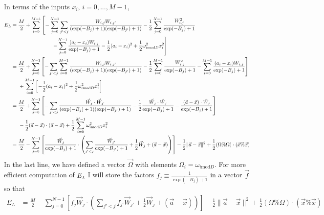 \documentclass[12pt]{article}
\begin{document}
In terms of the inputs $x_i$, $i = 0, ..., M-1$,
\begin{align*}
E_L &= \frac{M}{2} +\sum_{i=0}^{M-1} \left[ - \sum_{j=0}^{N-1} \sum_{j'<j} \frac{W_{i,j}W_{i,j'}}{(\exp(-B_j)+1)(\exp(-B_{j'})+1)}
-\frac{1}{2} \sum_{j=0}^{N-1} \frac{W_{i,j}^2}{\exp(-B_j)+1} \right.\\
&\hspace*{2.75cm} \left. -\sum_{j=0}^{N-1} \frac{(a_{i} -x_i ) W_{i,j}}{\exp(-B_j)+1} - \frac{1}{2} (a_{i}-x_i)^2 + \frac{1}{2} \omega_{i\text{mod}D}^2 x_i^2 \right]\\
&= \frac{M}{2} +\sum_{j=0}^{N-1} \left[ - \sum_{j'<j}\sum_{i=0}^{M-1} \frac{W_{i,j}W_{i,j'}}{(\exp(-B_j)+1)(\exp(-B_{j'})+1)}
-\frac{1}{2}\sum_{i=0}^{M-1} \frac{W_{i,j}^2}{\exp(-B_j)+1} - \sum_{i=0}^{M-1} \frac{(a_{i} -x_i ) W_{i,j}}{\exp(-B_j)+1}\right]\\
&\hspace*{.5cm}+\sum_{i=0}^{M-1} \left[ - \frac{1}{2} (a_{i}-x_i)^2 + \frac{1}{2} \omega_{i\text{mod}D}^2 x_i^2 \right]\\
&= \frac{M}{2} +\sum_{j=0}^{N-1} \left[ - \sum_{j'<j} \frac{\vec{W}_j\cdot \vec{W}_{j'}}{(\exp(-B_j)+1)(\exp(-B_{j'})+1)}
-\frac{1}{2} \frac{\vec{W}_j\cdot \vec{W}_j}{\exp(-B_j)+1} - \frac{(\vec{a}-\vec{x})\cdot \vec{W}_j }{\exp(-B_j)+1}\right]\\
&\hspace*{.5cm}  - \frac{1}{2} (\vec{a}-\vec{x}) \cdot (\vec{a}-\vec{x}) + \frac{1}{2}  \sum_{i=0}^{M-1}\omega_{i\text{mod}D}^2 x_i^2 \\
&= \frac{M}{2} -\sum_{j=0}^{N-1} \left[ \frac{\vec{W}_j}{\exp(-B_j)+1} \cdot \left( \sum_{j'<j} \frac{\vec{W}_{j'}}{\exp(-B_{j'})+1}
+\frac{1}{2} \vec{W}_j +(\vec{a}-\vec{x})\right) \right]  - \frac{1}{2} \| \vec{a}-\vec{x}\|^2 + \frac{1}{2} (\Omega \% \Omega)\cdot (\vec{x} \% \vec{x}) \\
\end{align*}
In the last line, we have defined a vector $\vec{\Omega}$ with elements $\Omega_i = \omega_{i\text{mod}D}$. For more efficient computation of $E_L$ I will store the factors $f_j\equiv \frac{1}{\exp(-B_j)+1}$ in a vector $\vec{f}$ so that
\begin{align*}
E_L&= \frac{M}{2} -\sum_{j=0}^{N-1} \left[ f_j\vec{W}_j\cdot \left( \sum_{j'<j} f_{j'}\vec{W}_{j'}
+\frac{1}{2} \vec{W}_j +(\vec{a}-\vec{x})\right) \right]  - \frac{1}{2} \| \vec{a}-\vec{x}\|^2 + \frac{1}{2} (\Omega \% \Omega)\cdot (\vec{x} \% \vec{x}) \\
\end{align*}
\end{document}

